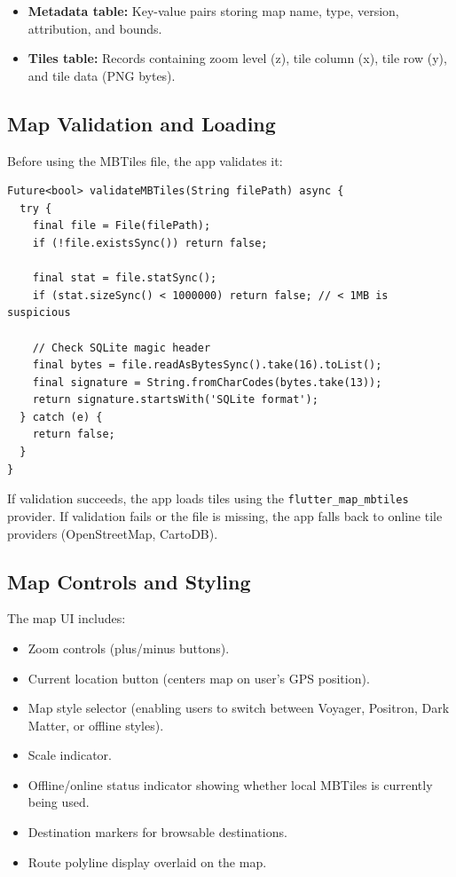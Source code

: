\documentclass[12pt,a4paper,oneside]{report}
\begin{document}
\begin{itemize}
\item \textbf{Metadata table:} Key-value pairs storing map name, type, version, attribution, and bounds.
\item \textbf{Tiles table:} Records containing zoom level (z), tile column (x), tile row (y), and tile data (PNG bytes).
\end{itemize}

\subsection{Map Validation and Loading}

Before using the MBTiles file, the app validates it:

\begin{lstlisting}
Future<bool> validateMBTiles(String filePath) async {
  try {
    final file = File(filePath);
    if (!file.existsSync()) return false;
    
    final stat = file.statSync();
    if (stat.sizeSync() < 1000000) return false; // < 1MB is suspicious
    
    // Check SQLite magic header
    final bytes = file.readAsBytesSync().take(16).toList();
    final signature = String.fromCharCodes(bytes.take(13));
    return signature.startsWith('SQLite format');
  } catch (e) {
    return false;
  }
}
\end{lstlisting}

If validation succeeds, the app loads tiles using the \texttt{flutter\_map\_mbtiles} provider. If validation fails or the file is missing, the app falls back to online tile providers (OpenStreetMap, CartoDB).

\subsection{Map Controls and Styling}

The map UI includes:

\begin{itemize}
\item Zoom controls (plus/minus buttons).
\item Current location button (centers map on user's GPS position).
\item Map style selector (enabling users to switch between Voyager, Positron, Dark Matter, or offline styles).
\item Scale indicator.
\item Offline/online status indicator showing whether local MBTiles is currently being used.
\item Destination markers for browsable destinations.
\item Route polyline display overlaid on the map.
\end{itemize}
\end{document}
